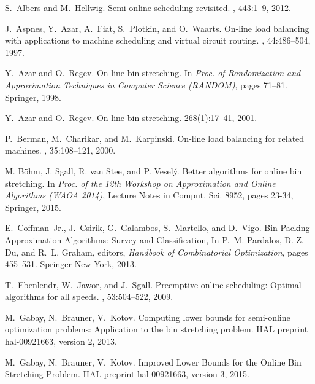 \begin{thebibliography}{99}
\setlength\itemsep{0pt}

S.~Albers and M.~Hellwig.
\newblock Semi-online scheduling revisited.
, 443:1--9, 2012.

J.~Aspnes, Y.~Azar, A.~Fiat, S.~Plotkin, and O.~Waarts.
\newblock On-line load balancing with applications to machine scheduling and
  virtual circuit routing.
, 44:486--504, 1997.

Y.~Azar and O.~Regev.
\newblock On-line bin-stretching.
\newblock In {\em Proc. of Randomization and Approximation Techniques in Computer
  Science (RANDOM)}, pages 71--81. Springer, 1998. 

Y.~Azar and O.~Regev.
\newblock On-line bin-stretching.
 268(1):17--41, 2001. 

P.~Berman, M.~Charikar, and M.~Karpinski.
\newblock On-line load balancing for related machines.
, 35:108--121, 2000.

M. B\"ohm, J. Sgall, R. van Stee, and P. Vesel\'y. 
\newblock Better algorithms for online bin stretching.
\newblock 
In {\em Proc. of the 12th Workshop on Approximation and Online Algorithms (WAOA 2014)}, Lecture Notes in Comput. Sci. 8952, pages 23-34, Springer, 2015.

E.~Coffman~Jr., J.~Csirik, G.~Galambos, S.~Martello, and D.~Vigo.
\newblock Bin Packing Approximation Algorithms: Survey and Classification,
\newblock In P.~M. Pardalos, D.-Z. Du, and R.~L. Graham, editors, {\em Handbook
of Combinatorial Optimization}, pages 455--531. Springer New York,
2013.

T.~Ebenlendr, W.~Jawor, and J.~Sgall.
\newblock Preemptive online scheduling: {O}ptimal algorithms for all speeds.
, 53:504--522, 2009.

M.~Gabay, N.~Brauner, V.~Kotov.
\newblock Computing lower bounds for semi-online optimization
problems: Application to the bin stretching problem. 
\newblock HAL preprint hal-00921663, version 2,
2013.

M.~Gabay, N.~Brauner, V.~Kotov.
\newblock Improved Lower Bounds for the Online Bin Stretching Problem. 
\newblock HAL preprint hal-00921663, version 3,
2015.


\end{thebibliography}
